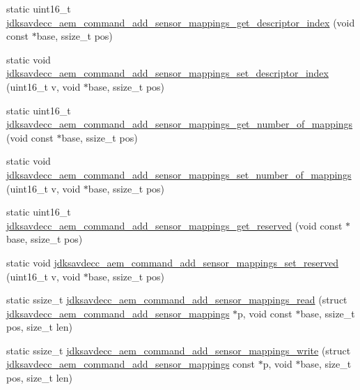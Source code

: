 \begin{DoxyCompactItemize}
\item 
static uint16\+\_\+t \hyperlink{group__command__add__sensor__mappings_ga36111be8af514db701a7f7c52899eb7c}{jdksavdecc\+\_\+aem\+\_\+command\+\_\+add\+\_\+sensor\+\_\+mappings\+\_\+get\+\_\+descriptor\+\_\+index} (void const $\ast$base, ssize\+\_\+t pos)
\item 
static void \hyperlink{group__command__add__sensor__mappings_ga14f2ea4e640384bace918d33b3d43654}{jdksavdecc\+\_\+aem\+\_\+command\+\_\+add\+\_\+sensor\+\_\+mappings\+\_\+set\+\_\+descriptor\+\_\+index} (uint16\+\_\+t v, void $\ast$base, ssize\+\_\+t pos)
\item 
static uint16\+\_\+t \hyperlink{group__command__add__sensor__mappings_gac15b22f3940df5c4e43b26c93ab79101}{jdksavdecc\+\_\+aem\+\_\+command\+\_\+add\+\_\+sensor\+\_\+mappings\+\_\+get\+\_\+number\+\_\+of\+\_\+mappings} (void const $\ast$base, ssize\+\_\+t pos)
\item 
static void \hyperlink{group__command__add__sensor__mappings_ga035fbadd331f24946064e348cc58d2ba}{jdksavdecc\+\_\+aem\+\_\+command\+\_\+add\+\_\+sensor\+\_\+mappings\+\_\+set\+\_\+number\+\_\+of\+\_\+mappings} (uint16\+\_\+t v, void $\ast$base, ssize\+\_\+t pos)
\item 
static uint16\+\_\+t \hyperlink{group__command__add__sensor__mappings_ga8a34174b011a3b9cc80069e8065f57c4}{jdksavdecc\+\_\+aem\+\_\+command\+\_\+add\+\_\+sensor\+\_\+mappings\+\_\+get\+\_\+reserved} (void const $\ast$base, ssize\+\_\+t pos)
\item 
static void \hyperlink{group__command__add__sensor__mappings_gaf27ce7609310c21cf400f3d234df405f}{jdksavdecc\+\_\+aem\+\_\+command\+\_\+add\+\_\+sensor\+\_\+mappings\+\_\+set\+\_\+reserved} (uint16\+\_\+t v, void $\ast$base, ssize\+\_\+t pos)
\item 
static ssize\+\_\+t \hyperlink{group__command__add__sensor__mappings_ga9f7007e8743c01d802b15efbf00810a7}{jdksavdecc\+\_\+aem\+\_\+command\+\_\+add\+\_\+sensor\+\_\+mappings\+\_\+read} (struct \hyperlink{structjdksavdecc__aem__command__add__sensor__mappings}{jdksavdecc\+\_\+aem\+\_\+command\+\_\+add\+\_\+sensor\+\_\+mappings} $\ast$p, void const $\ast$base, ssize\+\_\+t pos, size\+\_\+t len)
\item 
static ssize\+\_\+t \hyperlink{group__command__add__sensor__mappings_ga54f5af8188b8fbf9ab5b981efa7051db}{jdksavdecc\+\_\+aem\+\_\+command\+\_\+add\+\_\+sensor\+\_\+mappings\+\_\+write} (struct \hyperlink{structjdksavdecc__aem__command__add__sensor__mappings}{jdksavdecc\+\_\+aem\+\_\+command\+\_\+add\+\_\+sensor\+\_\+mappings} const $\ast$p, void $\ast$base, size\+\_\+t pos, size\+\_\+t len)
\end{DoxyCompactItemize}


